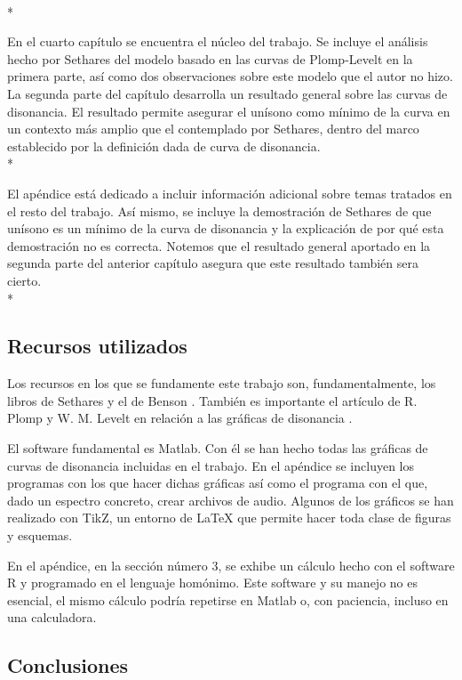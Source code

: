 \documentclass[11pt,a4paper]{article}
\begin{document}
\\*

En el cuarto capítulo se encuentra el núcleo del trabajo. Se incluye el análisis hecho por Sethares del modelo basado en las curvas de Plomp-Levelt en la primera parte, así como dos observaciones sobre este modelo que el autor no hizo. La segunda parte del capítulo desarrolla un resultado general sobre las curvas de disonancia. El resultado permite asegurar el unísono como mínimo de la curva en un contexto más amplio que el contemplado por Sethares, dentro del marco establecido por la definición dada de curva de disonancia.
\\*


El apéndice está dedicado a incluir información adicional sobre temas tratados en el resto del trabajo. Así mismo, se incluye la demostración de Sethares de que unísono es un mínimo de la curva  de disonancia y la explicación de por qué esta demostración no es correcta. Notemos que el resultado general aportado en la segunda parte del anterior capítulo asegura que este resultado también sera cierto.\\*

\subsection{Recursos utilizados}

Los recursos en los que se fundamente este trabajo son, fundamentalmente, los libros de Sethares \cite{Set} y el de Benson \cite{Bens}. También es importante el artículo de R. Plomp y W. M. Levelt en relación a las gráficas de disonancia \cite{PL}.

El software fundamental es Matlab. Con él se han hecho todas las gráficas de curvas de disonancia incluidas en el trabajo. En el apéndice se incluyen los programas con los que hacer dichas gráficas así como el programa con el que, dado un espectro concreto, crear archivos de audio. Algunos de los gráficos se han realizado con TikZ, un entorno de \LaTeX{} que permite hacer toda clase de figuras y esquemas.

En el apéndice, en la sección número $3$, se exhibe un cálculo hecho con el software R y programado en el lenguaje homónimo. Este software y su manejo no es esencial, el mismo cálculo podría repetirse en Matlab o, con paciencia, incluso en una calculadora.


\subsection{Conclusiones}
\end{document}

